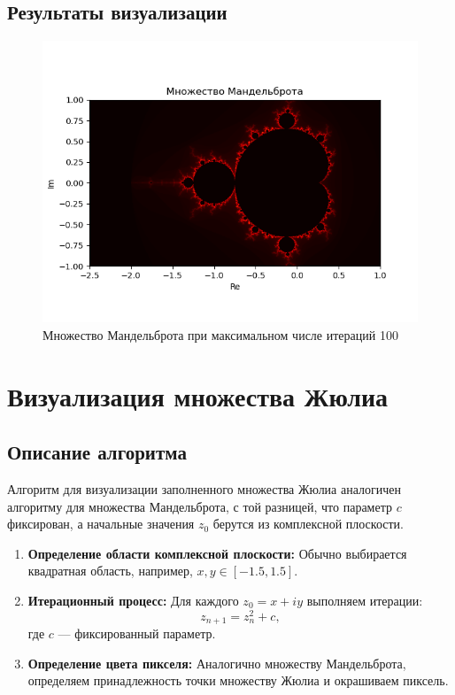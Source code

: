\documentclass{article}
\begin{document}
	\newpage
	
	\subsection{Результаты визуализации}
	
	\begin{figure}[H]
		\centering
		\includegraphics[width=1\textwidth]{images/screenshot001}
		\caption{Множество Мандельброта при максимальном числе итераций 100}
		\label{fig:mandelbrot}
	\end{figure}
	
	\newpage
	
	\section{Визуализация множества Жюлиа}
	
	\subsection{Описание алгоритма}
	Алгоритм для визуализации заполненного множества Жюлиа аналогичен алгоритму для множества Мандельброта, с той разницей, что параметр $c$ фиксирован, а начальные значения $z_0$ берутся из комплексной плоскости.
	
	\begin{enumerate}
		\item \textbf{Определение области комплексной плоскости:} Обычно выбирается квадратная область, например, $x, y \in [-1.5, 1.5]$.
		\item \textbf{Итерационный процесс:} Для каждого $z_0 = x + iy$ выполняем итерации:
		\begin{equation}
			z_{n+1} = z_n^2 + c,
		\end{equation}
		где $c$ — фиксированный параметр.
		\item \textbf{Определение цвета пикселя:} Аналогично множеству Мандельброта, определяем принадлежность точки множеству Жюлиа и окрашиваем пиксель.
	\end{enumerate}
	
\end{document}
